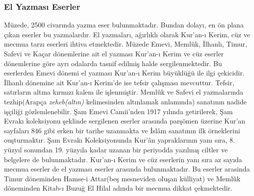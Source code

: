 \subsubsection{El Yazması Eserler}
\indent\indent Müzede, 2500 civarında yazma eser bulunmaktadır. Bundan dolayı, en ön plana çıkan eserler bu yazmalardır. El yazmaları, ağırlıklı olarak Kur'an-ı Kerim, cüz ve mecmua tarzı eserleri ihtiva etmektedir.\newline
\indent Müzede Emevi, Memlûk, İlhanlı, Timur, Safevi ve Kaçar dönemlerine ait el yazması Kur'an-ı Kerim ve cüz eserler dönemlerine göre ayrı odalarda tasnif edilmiş halde sergilenmektedir. Bu eserlerden Emevi dönemi el yazması Kur'an-ı Kerim büyüklüğü ile ilgi çekicidir. İlhanlı dönemine ait Kur'an-ı Kerim'de ise tefsir çalışması mevcuttur. Tefsir, satırların altına kırmızı kalem ile işlenmiştir. Memlûk ve Safevi el yazmalarında tezhip(Arapça \textit{zeheb(altın)} kelimesinden altınlamak anlamında) sanatının nadide işçiliği gözlemlenebilir. Şam Emevi Camii'nden 1917 yılında getirilerek, Şam Evrakı koleksiyonu şeklinde sergilenen eserler arasında parşömen üzerine Kur'an sayfaları 846 gibi erken bir tarihe uzanmakta ve İslâm sanatının ilk örneklerini ouşturmaktır. Şam Evrakı Koleksiyonunda Kur'ân yapraklarının yanı sıra, 8. yüzyıl sonundan 19. yüzyıla kadar uzanan bir periyodda yazılmış ciltler ve belgelere de bulunmaktadır.\newline
\indent Kur'an-ı Kerim ve cüz eserlerin yanı sıra az sayıda mecmua eserler de el yazması eserler arasında bulunmaktadır. Bu eserler arasinda Timur döneminden Hamse-i Attar(beş mesneviden oluşan külliyat) ve Memlûk döneminden Kitab-ı Buzuğ El Hilal adında bir mecmua dikkat çekmektedir.
\begin{figure}[th]
    \centering
    \hfill
\end{figure}
